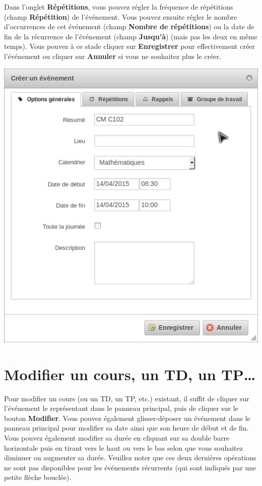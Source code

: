 \documentclass[a4paper, 11pt]{report}
\begin{document}
			Dans l’onglet \textbf{Répétitions}, vous pouvez régler la fréquence de répétitions (champ \textbf{Répétition}) de l’événement. Vous pouvez ensuite régler le nombre d’occurrences de cet événement (champ \textbf{Nombre de répétitions}) ou la date de fin de la récurrence de l’événement (champ \textbf{Jusqu’à}) (mais pas les deux en même temps). Vous pouvez à ce stade cliquer sur \textbf{Enregistrer} pour effectivement créer l’événement ou cliquer sur \textbf{Annuler} si vous ne souhaitez plus le créer.

			\begin{center}
				\includegraphics[scale = 0.7]{creer_evenement.png}
			\end{center}
		\section{Modifier un cours, un TD, un TP…}
			Pour modifier un cours (ou un TD, un TP, etc.) existant, il suffit de cliquer sur l’événement le représentant dans le panneau principal, puis de cliquer sur le bouton \textbf{Modifier}. Vous pouvez également glisser-déposer un événement dans le panneau principal pour modifier sa date ainsi que son heure de début et de fin. Vous pouvez également modifier sa durée en cliquant sur sa double barre horizontale puis en tirant vers le haut ou vers le bas selon que vous souhaitez diminuer ou augmenter sa durée. Veuillez noter que ces deux dernières opérations ne sont pas disponibles pour les événements récurrents (qui sont indiqués par une petite flèche bouclée).
\end{document}
